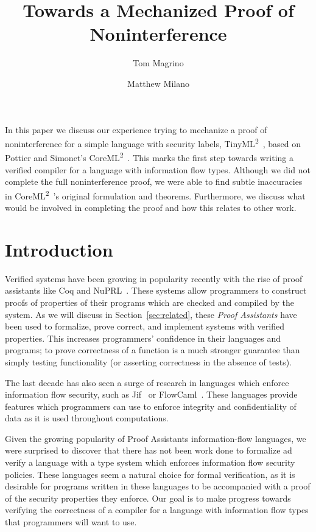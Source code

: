\documentclass[a4paper,twocolumn]{article}
\title{Towards a Mechanized Proof of Noninterference}
\author{Tom Magrino \and Matthew Milano}
\newcommand{\langName}[0]{TinyML\textsuperscript{2}~}
\newcommand{\origLang}[0]{CoreML\textsuperscript{2}~}
\theoremstyle{plain}
\theoremstyle{definition}
\begin{document}
\maketitle

\abstract

In this paper we discuss our experience trying to mechanize a proof of
noninterference for a simple language with security labels, \langName, based on
Pottier and Simonet's \origLang.  This
marks the first step towards writing a verified compiler for a language with
information flow types.  Although we did not complete the full noninterference
proof, we were able to find subtle inaccuracies in \origLang's original
formulation and theorems.  Furthermore, we discuss what would be involved in
completing the proof and how this relates to other work.

\section{Introduction}

Verified systems have been growing in popularity recently with the rise of proof
assistants like Coq and NuPRL~\cite{coqart,nuprl}.  
These systems allow programmers to construct proofs of properties of their programs which are checked and compiled by the system.  As we will
discuss in Section~\ref{sec:related}, these \emph{Proof Assistants} have been used to formalize,
prove correct, and implement systems with verified properties.  This increases programmers' confidence in their languages and programs; to prove correctness of a function is a much stronger guarantee than simply testing functionality (or asserting correctness in the absence of tests).

The last decade has also seen a surge of research in languages which enforce information flow security, such as Jif~\cite{myers1999jflow} or FlowCaml~\cite{simonet2003flow}.  These languages provide features which programmers can use to enforce integrity and confidentiality of data as it is used throughout computations.

Given the growing popularity of Proof Assistants information-flow languages, we were surprised to discover 
that there has not been work done to formalize ad verify a language with a type system which enforces information flow security policies.
These languages seem a natural choice for formal verification, as it is desirable for programs written in these languages to be accompanied with a proof of the security properties they enforce.
Our goal is to make progress towards verifying the correctness of a
compiler for a language with information flow types that programmers will want
to use.
\end{document}
